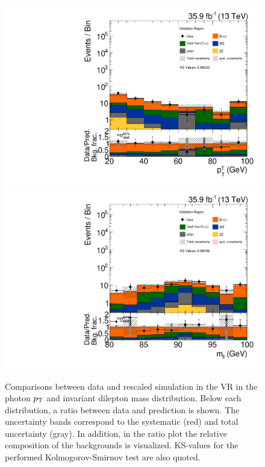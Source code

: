 \begin{figure}[tbp]
 \centering
 \includegraphics[width=\pairwidth]{figures/plots_VR/VR_LL_pt_g1_log}
 \includegraphics[width=\pairwidth]{figures/plots_VR/VR_LL_m_ll_log}
 \caption{Comparisons between data and rescaled simulation in the VR in the photon $p_{\mathrm{T}}$ and invariant dilepton mass distribution. Below each distribution, a ratio between data and prediction is shown. The uncertainty bands correspond to the systematic (red) and total uncertainty (gray). In addition, in the ratio plot the relative composition of the backgrounds is visualized. KS-values for the performed Kolmogorov-Smirnov test are also quoted.}
 \label{fig:VR2}
\end{figure}


